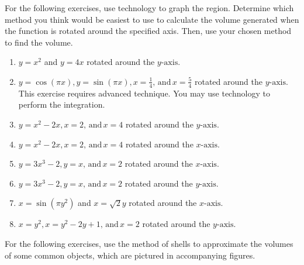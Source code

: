 \documentclass{exercises}
\begin{document}
For the following exercises, use technology to graph the region. Determine which method you think would be easiest to use to calculate the volume generated when the function is rotated around the specified axis. Then, use your chosen method to find the volume.

\begin{enumerate}[resume]
\item \techrequired $y=x^{2}$ and $y=4x$ rotated around the $y\text{-axis}$.
\item \techrequired $y=\cos(\pi x),y=\sin(\pi x),x=\frac{1}{4},\,\text{and}\,x=\frac{5}{4}$ rotated around the $y\text{-axis}$. This exercise requires advanced technique. You may use technology to perform the integration.
\item \techrequired $y=x^{2}-2x,x=2,\,\text{and}\,x=4$ rotated around the $y\text{-axis}$.
\item \techrequired $y=x^{2}-2x,x=2,\,\text{and}\,x=4$ rotated around the $x\text{-axis}$.
\item \techrequired $y=3x^{3}-2,y=x,\,\text{and}\,x=2$ rotated around the $x\text{-axis}$.
\item \techrequired $y=3x^{3}-2,y=x,\,\text{and}\,x=2$ rotated around the $y\text{-axis}$.
\item \techrequired $x=\sin(\pi y^{2})$ and $x=\sqrt{2}y$ rotated around the $x\text{-axis}$.
\item \techrequired $x=y^{2},x=y^{2}-2y+1,\,\text{and}\,x=2$ rotated around the $y\text{-axis}$.
\end{enumerate}

For the following exercises, use the method of shells to approximate the volumes of some common objects, which are pictured in accompanying figures.
\end{document}

